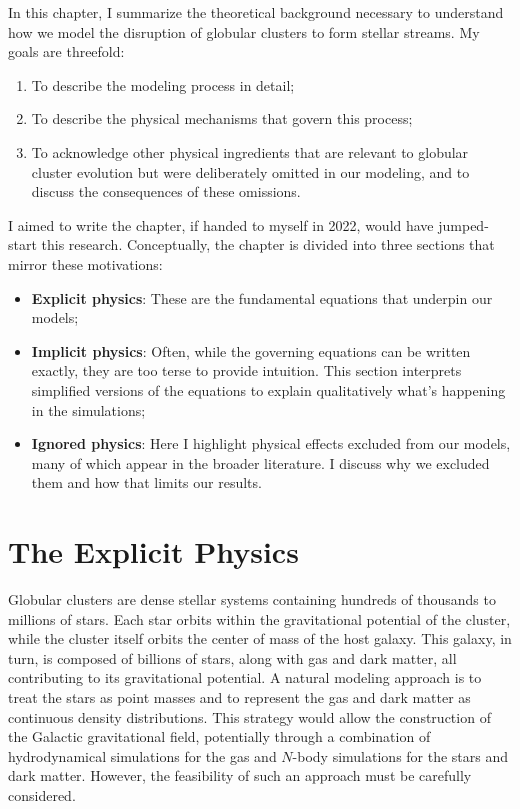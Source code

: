 \noindent In this chapter, I summarize the theoretical background necessary to understand how we model the disruption of globular clusters to form stellar streams. My goals are threefold:
\begin{enumerate}
    \item To describe the modeling process in detail;
    \item To describe the physical mechanisms that govern this process;
    \item To acknowledge other physical ingredients that are relevant to globular cluster evolution but were deliberately omitted in our modeling, and to discuss the consequences of these omissions. 
\end{enumerate}
I aimed to write the chapter, if handed to myself in 2022, would have jumped-start this research. Conceptually, the chapter is divided into three sections that mirror these motivations:

\begin{itemize}
    \item \textbf{Explicit physics}: These are the fundamental equations that underpin our models;
    \item \textbf{Implicit physics}: Often, while the governing equations can be written exactly, they are too terse to provide intuition. This section interprets simplified versions of the equations to explain qualitatively what's happening in the simulations;
    \item \textbf{Ignored physics}: Here I highlight physical effects excluded from our models, many of which appear in the broader literature. I discuss why we excluded them and how that limits our results.
\end{itemize}


\section{The Explicit Physics}
    Globular clusters are dense stellar systems containing hundreds of thousands to millions of stars. Each star orbits within the gravitational potential of the cluster, while the cluster itself orbits the center of mass of the host galaxy. This galaxy, in turn, is composed of billions of stars, along with gas and dark matter, all contributing to its gravitational potential. A natural modeling approach is to treat the stars as point masses and to represent the gas and dark matter as continuous density distributions. This strategy would allow the construction of the Galactic gravitational field, potentially through a combination of hydrodynamical simulations for the gas and $N$-body simulations for the stars and dark matter. However, the feasibility of such an approach must be carefully considered.

